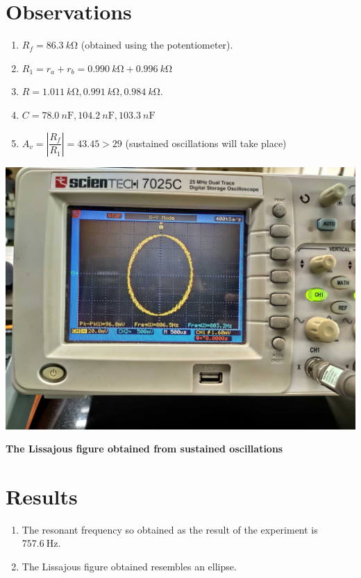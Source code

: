 \section{Observations}
\begin{enumerate}
    \item $R_f = \SI{86.3}{k \ohm}$ (obtained using the potentiometer). 
    \item $R_1 = r_a + r_b = \SI{0.990}{k\ohm} + \SI{0.996}{k \ohm}$
    \item $R = \SI{1.011}{k\ohm}, \SI{0.991}{k \ohm}, \SI{0.984}{k \ohm}$.
    \item $C = \SI{78.0}{n \farad}, \SI{104.2}{n \farad}, \SI{103.3}{n \farad}$
    \item $A_v = |\dfrac{R_f}{R_1}| = 43.45 > 29$ (sustained oscillations will take place)
\end{enumerate}
\begin{center}
    \includegraphics[scale = 0.11]{Documents/Lissajous.jpg}
\end{center}
\begin{center}
    \textbf{The Lissajous figure obtained from sustained oscillations}
\end{center}
\section{Results}
\begin{enumerate}
    \item The resonant frequency so obtained as the result of the experiment is $\SI{757.6}{\hertz}$.
    \item The Lissajous figure obtained resembles an ellipse.
\end{enumerate}
